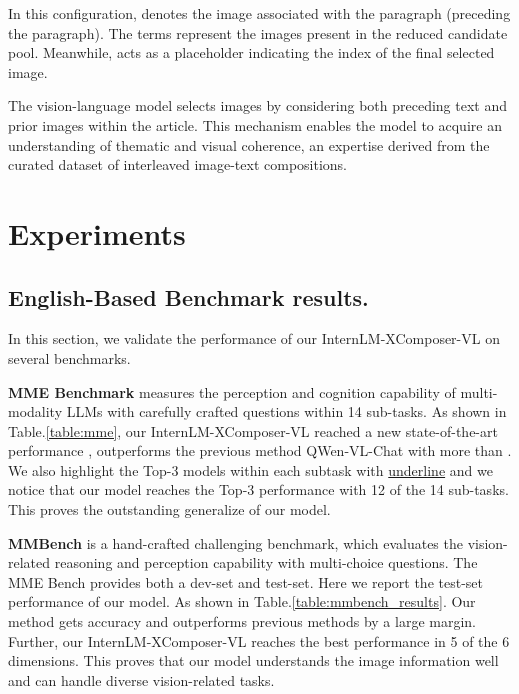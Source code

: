 \documentclass[10pt,twocolumn,letterpaper]{article}
\begin{document}
In this configuration,  denotes the image associated with the  paragraph (preceding the  paragraph). The terms  represent the images present in the reduced candidate pool. Meanwhile,  acts as a placeholder indicating the index of the final selected image.

The vision-language model selects images by considering both preceding text and prior images within the article. This mechanism enables the model to acquire an understanding of thematic and visual coherence, an expertise derived from the curated dataset of interleaved image-text compositions. \section{Experiments}

\subsection{English-Based Benchmark results.}

In this section, we validate the performance of our InternLM-XComposer-VL on several benchmarks. 

\noindent\textbf{MME Benchmark} measures the perception and cognition capability of multi-modality LLMs with carefully crafted questions within 14 sub-tasks. As shown in Table.\ref{table:mme}, our InternLM-XComposer-VL reached a new state-of-the-art performance , outperforms the previous method QWen-VL-Chat with more than . We also highlight the Top-3 models within each subtask with \underline{underline} and we notice that our model reaches the Top-3 performance with 12 of the 14 sub-tasks. This proves the outstanding generalize of our model.

\noindent\textbf{MMBench} is a hand-crafted challenging benchmark, which evaluates the vision-related reasoning and perception capability with multi-choice questions. The MME Bench provides both a dev-set and test-set.
Here we report the test-set performance of our model. As shown in Table.\ref{table:mmbench_results}. Our method gets  accuracy and outperforms previous methods by a large margin. Further, our InternLM-XComposer-VL reaches the best performance in 5 of the 6 dimensions. This proves that our model understands the image information well and can handle diverse vision-related tasks.
\end{document}
